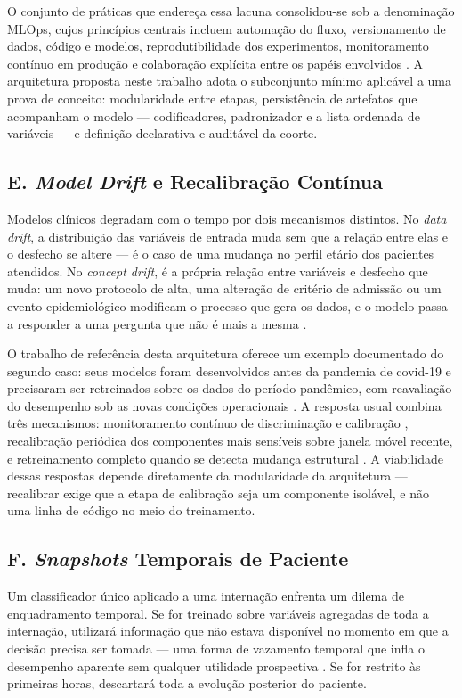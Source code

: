 \documentclass{ieeeaccess}
\begin{document}
O conjunto de práticas que endereça essa lacuna consolidou-se sob a denominação MLOps, cujos princípios centrais incluem automação do fluxo, versionamento de dados, código e modelos, reprodutibilidade dos experimentos, monitoramento contínuo em produção e colaboração explícita entre os papéis envolvidos \cite{Kreuzberger2023}. A arquitetura proposta neste trabalho adota o subconjunto mínimo aplicável a uma prova de conceito: modularidade entre etapas, persistência de artefatos que acompanham o modelo --- codificadores, padronizador e a lista ordenada de variáveis --- e definição declarativa e auditável da coorte.

\subsection*{E. \textit{Model Drift} e Recalibração Contínua}
Modelos clínicos degradam com o tempo por dois mecanismos distintos. No \textit{data drift}, a distribuição das variáveis de entrada muda sem que a relação entre elas e o desfecho se altere --- é o caso de uma mudança no perfil etário dos pacientes atendidos. No \textit{concept drift}, é a própria relação entre variáveis e desfecho que muda: um novo protocolo de alta, uma alteração de critério de admissão ou um evento epidemiológico modificam o processo que gera os dados, e o modelo passa a responder a uma pergunta que não é mais a mesma \cite{Finlayson2021}.

O trabalho de referência desta arquitetura oferece um exemplo documentado do segundo caso: seus modelos foram desenvolvidos antes da pandemia de covid-19 e precisaram ser retreinados sobre os dados do período pandêmico, com reavaliação do desempenho sob as novas condições operacionais \cite{King2022}. A resposta usual combina três mecanismos: monitoramento contínuo de discriminação e calibração \cite{VanCalster2019}, recalibração periódica dos componentes mais sensíveis sobre janela móvel recente, e retreinamento completo quando se detecta mudança estrutural \cite{Finlayson2021}. A viabilidade dessas respostas depende diretamente da modularidade da arquitetura --- recalibrar exige que a etapa de calibração seja um componente isolável, e não uma linha de código no meio do treinamento.

\subsection*{F. \textit{Snapshots} Temporais de Paciente}
Um classificador único aplicado a uma internação enfrenta um dilema de enquadramento temporal. Se for treinado sobre variáveis agregadas de toda a internação, utilizará informação que não estava disponível no momento em que a decisão precisa ser tomada --- uma forma de vazamento temporal que infla o desempenho aparente sem qualquer utilidade prospectiva \cite{Kapoor2023}. Se for restrito às primeiras horas, descartará toda a evolução posterior do paciente.
\end{document}
